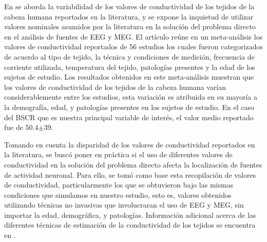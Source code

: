 En \cite{McCann2019} se aborda la variabilidad de los valores de conductividad de los tejidos de la cabeza humana reportados en la literatura, y se expone la inquietud de utilizar valores nominales asumidos por la literatura en la solución del problema directo en el análisis de fuentes de EEG y MEG.
El artículo reúne en un meta-análisis los valores de conductividad reportados de 56 estudios los cuales fueron categorizados de acuerdo al tipo de tejido, la técnica y condiciones de medición, frecuencia de corriente utilizada, temperatura del tejido, patologías presentes y la edad de los sujetos de estudio.
Los resultados obtenidos en este meta-análisis muestran que los valores de conductividad de los tejidos de la cabeza humana varían considerablemente entre los estudios, esta variación es atribuida en su mayoría a la demografía, edad, y patologías presentes en los sujetos de estudio.
En el caso del BSCR que es nuestra principal variable de interés, el valor medio reportado fue de 50.4$\mathbf{\pm}$39. 

Tomando en cuenta la disparidad de los valores de conductividad reportados en la literatura, se buscó poner en práctica si el uso de diferentes valores de conductividad en la solución del problema directo afecta la localización de fuentes de actividad neuronal.
Para ello, se tomó como base esta recopilación de valores de conductividad, particularmente los que se obtuvieron bajo las mismas condiciones que simulamos en nuestro estudio, esto es, valores obtenidos utilizando técnicas no invasivas que involucraran el uso de EEG y MEG, sin importar la edad, demográfica, y patologías.
Información adicional acerca de las diferentes técnicas de estimación de la conductividad de los tejidos se encuentra en .

